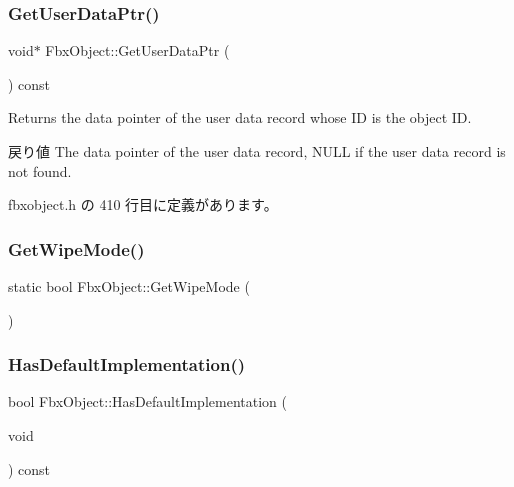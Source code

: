 \subsubsection{\texorpdfstring{Get\+User\+Data\+Ptr()}{GetUserDataPtr()}\hspace{0.1cm}{\footnotesize\ttfamily [2/2]}}
{\footnotesize\ttfamily void$\ast$ Fbx\+Object\+::\+Get\+User\+Data\+Ptr (\begin{DoxyParamCaption}{ }\end{DoxyParamCaption}) const\hspace{0.3cm}{\ttfamily [inline]}}

Returns the data pointer of the user data record whose ID is the object ID. \begin{DoxyReturn}{戻り値}
The data pointer of the user data record, {\ttfamily N\+U\+LL} if the user data record is not found. 
\end{DoxyReturn}


 fbxobject.\+h の 410 行目に定義があります。

\mbox{\label{class_fbx_object_a14b73206429c6b2e9c4d6d934721d43a}} 
\subsubsection{\texorpdfstring{Get\+Wipe\+Mode()}{GetWipeMode()}}
{\footnotesize\ttfamily static bool Fbx\+Object\+::\+Get\+Wipe\+Mode (\begin{DoxyParamCaption}{ }\end{DoxyParamCaption})\hspace{0.3cm}{\ttfamily [static]}}

\mbox{\label{class_fbx_object_a9703e0631381d9bbc91cac102198cf36}} 
\subsubsection{\texorpdfstring{Has\+Default\+Implementation()}{HasDefaultImplementation()}}
{\footnotesize\ttfamily bool Fbx\+Object\+::\+Has\+Default\+Implementation (\begin{DoxyParamCaption}\item[{void}]{ }\end{DoxyParamCaption}) const}

